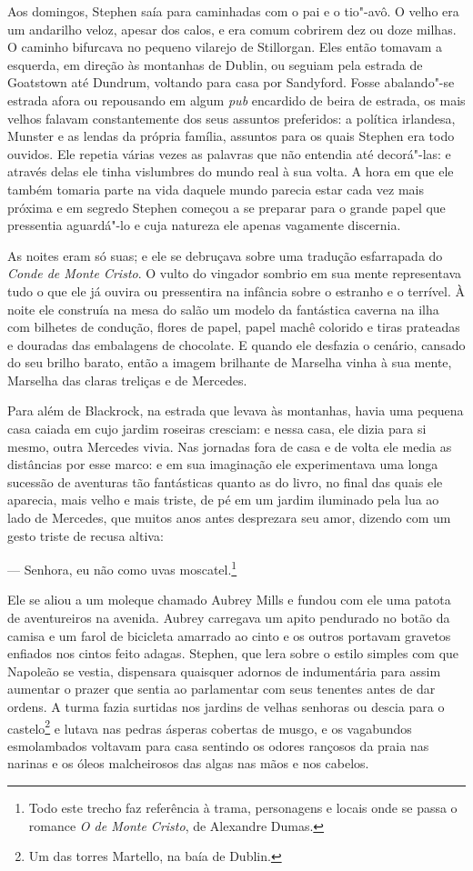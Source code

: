 Aos domingos, Stephen saía para caminhadas com o pai e o tio"-avô.
O velho era um andarilho veloz, apesar dos calos, e era comum cobrirem
dez ou doze milhas. O caminho bifurcava no pequeno vilarejo de
Stillorgan. Eles então tomavam a esquerda, em direção às montanhas de
Dublin, ou seguiam pela estrada de Goatstown até Dundrum, voltando para
casa por Sandyford. Fosse abalando"-se estrada afora ou repousando em
algum \textit{pub} encardido de beira de estrada, os mais
velhos falavam constantemente dos seus assuntos preferidos: a política
irlandesa, Munster e as lendas da própria família, assuntos para os
quais Stephen era todo ouvidos. Ele repetia várias vezes as palavras
que não entendia até decorá"-las: e através delas ele tinha vislumbres
do mundo real à sua volta. A hora em que ele também tomaria parte na
vida daquele mundo parecia estar cada vez mais próxima e em segredo
Stephen começou a se preparar para o grande papel que pressentia
aguardá"-lo e cuja natureza ele apenas vagamente discernia.

As noites eram só suas; e ele se debruçava sobre uma tradução
esfarrapada do \textit{Conde de Monte Cristo}. O vulto do vingador sombrio em
sua mente representava tudo o que ele já ouvira ou pressentira na
infância sobre o estranho e o terrível. À noite ele construía na mesa
do salão um modelo da fantástica caverna na ilha com bilhetes de
condução, flores de papel, papel machê colorido e tiras prateadas e 
douradas das embalagens de chocolate. E quando ele desfazia o cenário,
cansado do seu brilho barato, então a imagem brilhante de Marselha
vinha à sua mente, Marselha das claras treliças e de Mercedes.

Para além de Blackrock, na estrada que levava às montanhas, havia uma
pequena casa caiada em cujo jardim roseiras cresciam: e nessa casa, ele
dizia para si mesmo, outra Mercedes vivia. Nas jornadas fora de
casa e de volta ele media as distâncias por esse marco: e em sua
imaginação ele experimentava uma longa sucessão de aventuras tão
fantásticas quanto as do livro, no final das quais ele aparecia, mais
velho e mais triste, de pé em um jardim iluminado pela lua ao lado de
Mercedes, que muitos anos antes desprezara seu amor,  dizendo com um
gesto triste de recusa altiva:

 --- Senhora, eu não como uvas moscatel.\footnote{ Todo este trecho faz
referência à trama, personagens e locais onde se passa o romance \textit{O
de Monte Cristo}, de Alexandre Dumas.}

Ele se aliou a um moleque chamado Aubrey Mills e fundou com ele uma
patota de aventureiros na avenida. Aubrey carregava um apito pendurado
no botão da camisa e um farol de bicicleta amarrado ao cinto e os
outros portavam gravetos enfiados nos cintos feito adagas. Stephen, que
lera sobre o estilo simples com que Napoleão se vestia, dispensara
quaisquer adornos de indumentária para assim aumentar o prazer que
sentia ao parlamentar com seus tenentes antes de dar ordens. A turma
fazia surtidas nos jardins de velhas senhoras ou descia para o
castelo\footnote{ Um das torres Martello, na baía de Dublin.} e lutava
nas pedras ásperas cobertas de musgo, e os vagabundos
esmolambados voltavam para casa sentindo os odores rançosos da praia
nas narinas e os óleos malcheirosos das algas nas mãos e nos cabelos.

